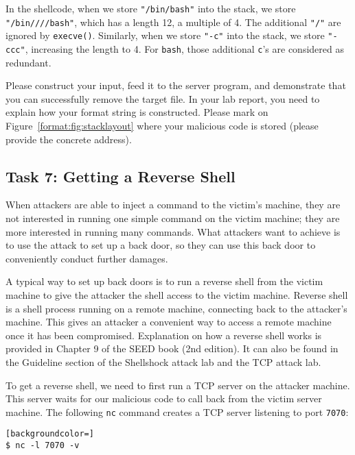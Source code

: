 In the shellcode, when we store \texttt{"/bin/bash"} into the stack, we store 
\texttt{"/bin////bash"}, which has a length 12, a multiple of 4. The additional \texttt{"/"}
are ignored by \texttt{execve()}. Similarly, when we store \texttt{"-c"} into the stack,
we store \texttt{"-ccc"}, increasing the length to 4. For \texttt{bash}, those 
additional \texttt{c}'s are considered as redundant.  


Please construct your input, feed it to the server program, and demonstrate that you can
successfully remove the target file. In your lab report, you need to explain
how your format string is constructed. Please mark on Figure~\ref{format:fig:stacklayout} where 
your malicious code is stored (please provide the concrete address). 


\subsection{Task 7: Getting a Reverse Shell}

When attackers are able to inject a command to the victim's machine, 
they are not interested in running one simple
command on the victim machine; they are more interested in running many
commands. What attackers want to achieve is to use the
attack to set up a back door, so they can use this
back door to conveniently conduct further damages.

A typical way to set up back doors is to run a reverse shell from the
victim machine to give the attacker the shell access to the victim machine.
Reverse shell is a shell process running on a remote machine, connecting
back to the attacker's machine. This gives an attacker a convenient way to
access a remote machine once it has been compromised. Explanation on how a
reverse shell works is provided in Chapter 9 of the SEED book (2nd edition). It can 
also be found in the Guideline section of the Shellshock attack lab 
and the TCP attack lab.


To get a reverse shell, we need to first run a TCP server on the attacker
machine. This server waits for our malicious code to call back from the 
victim server machine. The following \texttt{nc} command creates a TCP
server listening to port \texttt{7070}:  

\begin{lstlisting}[backgroundcolor=]
$ nc -l 7070 -v
\end{lstlisting}


